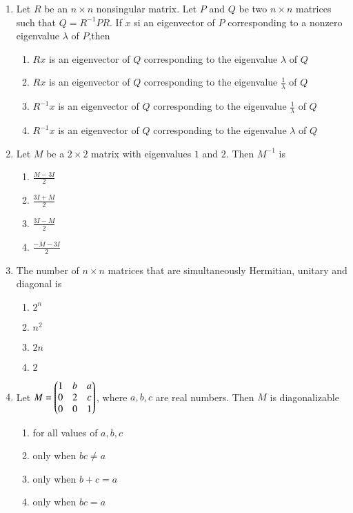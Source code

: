 \documentclass[journal]{IEEEtran}
\begin{document}
\begin{enumerate}
    \item Let $R$ be an $n \times n$ nonsingular matrix. Let $P$ and $Q$ be two $n \times n$ matrices such
    that $Q= R^{-1}PR$. If $x$ si an eigenvector of $P$ corresponding to a nonzero eigenvalue $\lambda$ of $P$,then
        \begin{enumerate}
            \item $Rx$ is an eigenvector of $Q$ corresponding to the eigenvalue $\lambda$ of $Q$
            \item $Rx$ is an eigenvector of $Q$ corresponding to the eigenvalue $\frac{1}{\lambda}$ of $Q$
            \item $R^{-1}x$ is an eigenvector of $Q$ corresponding to the eigenvalue $\frac{1}{\lambda}$ of $Q$
            \item $R^{-1}x$ is an eigenvector of $Q$ corresponding to the eigenvalue $\lambda$ of $Q$
        \end{enumerate}

    \item Let $M$ be a $2 \times 2$ matrix with eigenvalues $1$ and $2$. Then $M^{-1}$ is
        \begin{enumerate}
            \item $\frac{M-3I}{2}$
            \item $\frac{3I+M}{2}$
            \item $\frac{3I-M}{2}$
            \item $\frac{-M-3I}{2}$
        \end{enumerate}

    \item The number of $n \times n$ matrices that are simultaneously Hermitian, unitary and diagonal is
        \begin{enumerate}
            \item $2^n$
            \item $n^2$
            \item $2n$
            \item $2$
        \end{enumerate}

    \item Let $M = \begin{pmatrix}1&b&a\\0&2&c\\0&0&1\end{pmatrix}$, where $a,b,c$ are real numbers. Then $M$ is diagonalizable 
        \begin{enumerate}
            \item for all values of $a,b,c$
            \item only when $bc \neq a$
            \item only when $b+c=a$
            \item only when $bc=a$
        \end{enumerate}


\end{enumerate}
\end{document}
